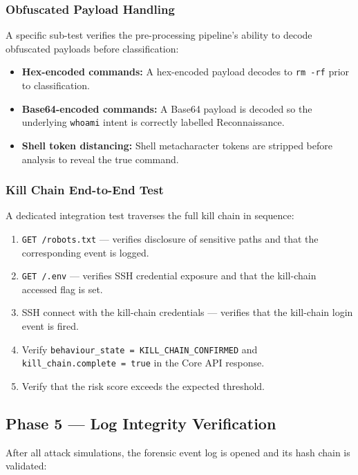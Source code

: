 \subsubsection{Obfuscated Payload Handling}

A specific sub-test verifies the pre-processing pipeline's ability to decode obfuscated payloads before classification:

\begin{itemize}
    \item \textbf{Hex-encoded commands:} A hex-encoded payload decodes to \texttt{rm -rf} prior to classification.
    \item \textbf{Base64-encoded commands:} A Base64 payload is decoded so the underlying \texttt{whoami} intent is correctly labelled Reconnaissance.
    \item \textbf{Shell token distancing:} Shell metacharacter tokens are stripped before analysis to reveal the true command.
\end{itemize}

\subsubsection{Kill Chain End-to-End Test}

A dedicated integration test traverses the full kill chain in sequence:

\begin{enumerate}
    \item \texttt{GET /robots.txt} — verifies disclosure of sensitive paths and that the corresponding event is logged.
    \item \texttt{GET /.env} — verifies \ac{SSH} credential exposure and that the kill-chain accessed flag is set.
    \item \ac{SSH} connect with the kill-chain credentials — verifies that the kill-chain login event is fired.
    \item Verify \texttt{behaviour\_state = KILL\_CHAIN\_CONFIRMED} and \texttt{kill\_chain.complete = true} in the Core API response.
    \item Verify that the risk score exceeds the expected threshold.
\end{enumerate}

\subsection{Phase 5 — Log Integrity Verification}

After all attack simulations, the forensic event log is opened and its hash chain is validated:

